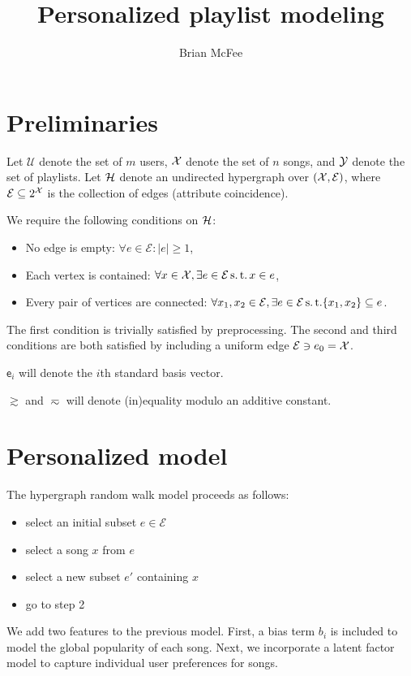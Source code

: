 \documentclass{article}
\title{Personalized playlist modeling}
\author{Brian McFee}
\def\e{\ensuremath{\mathsf{e}}}
\def\E{\ensuremath{\mathcal{E}}}
\def\U{\ensuremath{\mathcal{U}}}
\begin{document}
\maketitle

\section{Preliminaries}

Let $\U$ denote the set of $m$ users, $\mathcal{X}$ denote the set of $n$ songs, and $\mathcal{Y}$ denote the set of playlists.
Let $\mathcal{H}$ denote an undirected hypergraph over $(\X, \E)$, where $\E \subseteq 2^\X$ is the
collection of edges (attribute coincidence).

We require the following conditions on $\mathcal{H}$:
\begin{itemize}
\item No edge is empty: $\forall e \in \E: |e| \geq 1$,
\item Each vertex is contained: $\forall x \in \X, \exists e \in \E \suchthat x \in e$,
\item Every pair of vertices are connected: $\forall x_1, x_2 \in \E, \exists e \in \E \suchthat \{x_1, x_2\} \subseteq e$.
\end{itemize}

The first condition is trivially satisfied by preprocessing.  The second and third conditions are both satisfied by including a uniform edge $\E \ni e_0 = \X$.

$\e_i$ will denote the $i$th standard basis vector.

$\gtrsim$ and $\eqsim$ will denote (in)equality modulo an additive constant.

\section{Personalized model}

The hypergraph random walk model proceeds as follows:
\begin{itemize}
\item select an initial subset $e \in \E$
\item select a song $x$ from $e$
\item select a new subset $e'$ containing $x$
\item go to step 2
\end{itemize}

We add two features to the previous model.  First, a bias term $b_i$ is included to model the global popularity of each
song.  Next, we incorporate a latent factor model to capture individual user preferences for songs.
\end{document}
